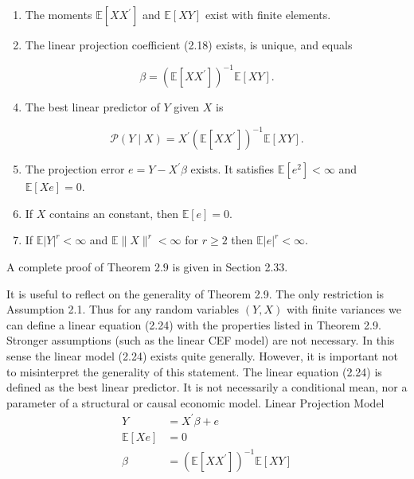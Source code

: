 \documentclass[10pt]{article}
\begin{document}
\begin{enumerate}
  \item The moments $\mathbb{E}\left[X X^{\prime}\right]$ and $\mathbb{E}[X Y]$ exist with finite elements.

  \item The linear projection coefficient (2.18) exists, is unique, and equals

\end{enumerate}
$$
\beta=\left(\mathbb{E}\left[X X^{\prime}\right]\right)^{-1} \mathbb{E}[X Y] .
$$

\begin{enumerate}
  \setcounter{enumi}{3}
  \item The best linear predictor of $Y$ given $X$ is
\end{enumerate}
$$
\mathscr{P}(Y \mid X)=X^{\prime}\left(\mathbb{E}\left[X X^{\prime}\right]\right)^{-1} \mathbb{E}[X Y] .
$$

\begin{enumerate}
  \setcounter{enumi}{4}
  \item The projection error $e=Y-X^{\prime} \beta$ exists. It satisfies $\mathbb{E}\left[e^{2}\right]<\infty$ and $\mathbb{E}[X e]=0$.

  \item If $X$ contains an constant, then $\mathbb{E}[e]=0$.

  \item If $\mathbb{E}|Y|^{r}<\infty$ and $\mathbb{E}\|X\|^{r}<\infty$ for $r \geq 2$ then $\mathbb{E}|e|^{r}<\infty$.

\end{enumerate}
A complete proof of Theorem $2.9$ is given in Section 2.33.

It is useful to reflect on the generality of Theorem 2.9. The only restriction is Assumption 2.1. Thus for any random variables $(Y, X)$ with finite variances we can define a linear equation (2.24) with the properties listed in Theorem 2.9. Stronger assumptions (such as the linear CEF model) are not necessary. In this sense the linear model (2.24) exists quite generally. However, it is important not to misinterpret the generality of this statement. The linear equation (2.24) is defined as the best linear predictor. It is not necessarily a conditional mean, nor a parameter of a structural or causal economic model. Linear Projection Model
$$
\begin{aligned}
Y &=X^{\prime} \beta+e \\
\mathbb{E}[X e] &=0 \\
\beta &=\left(\mathbb{E}\left[X X^{\prime}\right]\right)^{-1} \mathbb{E}[X Y]
\end{aligned}
$$
\end{document}
